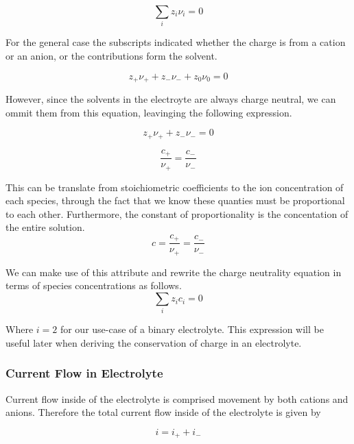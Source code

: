 \documentclass[lettersize,journal]{IEEEtran}
\begin{document}
\begin{equation}
  \sum_{i} z_{i} \nu_{i}=0
\end{equation}

For the general case the subscripts indicated whether the charge is from a cation or an anion, or the contributions form the solvent.

\begin{equation}
  z_{+} \nu_{+}+z_{-} \nu_{-}+z_{0} \nu_{0}=0
\end{equation}

However, since the solvents in the electroyte are always charge neutral, we can ommit them from this equation, leavinging the following expression.


\begin{equation}
  z_{+} \nu_{+}+z_{-} \nu_{-}=0
\end{equation}

\begin{equation}
  \frac{c_{+}}{\nu_{+}}=\frac{c_{-}}{\nu_{-}}
\end{equation}

This can be translate from stoichiometric coefficients to the ion concentration of each species, through the fact that we know these quanties must be proportional to each other. Furthermore, the constant of proportionality is the concentation of the entire solution.
\begin{equation}
  c = \frac{c_{+}}{\nu_{+}} = \frac{c_{-}}{\nu_{-}}
\end{equation}

We can make use of this attribute and rewrite the charge neutrality equation in terms of species concentrations as follows.
\begin{equation}
  \sum_{i} z_i c_i = 0
\end{equation}

Where $ i=2$ for our use-case of a binary electrolyte. This expression will be useful later when deriving the conservation of charge in an electrolyte. \\

\subsubsection{ Current Flow in Electrolyte}

Current flow inside of the electrolyte is comprised movement by both cations and anions. Therefore the total current flow inside of the electrolyte is given by

\begin{equation}
  i = i_{+} + i_{-}
\end{equation}
\end{document}
